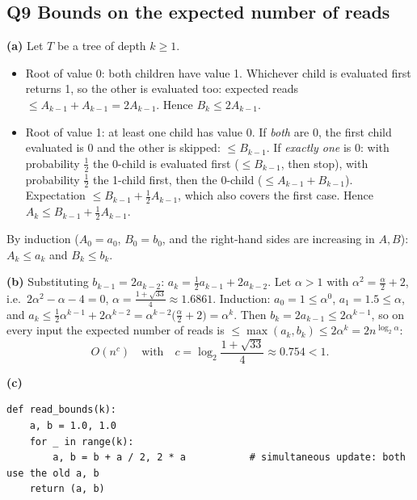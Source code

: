 \documentclass[11pt,a4paper]{article}
\newcommand{\pts}[3]{\fcolorbox{#3}{white}{\color{#3}\textbf{#1\,/\,#2}}}
\begin{document}
\subsection*{Q9 \quad Bounds on the expected number of reads \hfill \pts{0}{3}{none}}
\textbf{(a)} Let $T$ be a tree of depth $k\ge1$.
\begin{itemize}[nosep,leftmargin=1.2em]
\item Root of value 0: both children have value 1. Whichever child is evaluated first returns 1,
  so the other is evaluated too: expected reads $\le A_{k-1}+A_{k-1}=2A_{k-1}$. Hence
  $B_k\le 2A_{k-1}$.
\item Root of value 1: at least one child has value 0.
  If \emph{both} are 0, the first child evaluated is 0 and the other is skipped: $\le B_{k-1}$.
  If \emph{exactly one} is 0: with probability $\frac12$ the 0-child is evaluated first
  ($\le B_{k-1}$, then stop), with probability $\frac12$ the 1-child first, then the 0-child
  ($\le A_{k-1}+B_{k-1}$). Expectation $\le B_{k-1}+\frac12A_{k-1}$, which also covers the first
  case. Hence $A_k\le B_{k-1}+\frac12A_{k-1}$.
\end{itemize}
By induction ($A_0=a_0$, $B_0=b_0$, and the right-hand sides are increasing in $A,B$):
$A_k\le a_k$ and $B_k\le b_k$.

\textbf{(b)} Substituting $b_{k-1}=2a_{k-2}$: $a_k=\frac12a_{k-1}+2a_{k-2}$. Let $\alpha>1$ with
$\alpha^2=\frac\alpha2+2$, i.e.\ $2\alpha^2-\alpha-4=0$, $\alpha=\frac{1+\sqrt{33}}4\approx1.6861$.
Induction: $a_0=1\le\alpha^0$, $a_1=1.5\le\alpha$, and
$a_k\le\frac12\alpha^{k-1}+2\alpha^{k-2}=\alpha^{k-2}\big(\frac\alpha2+2\big)=\alpha^k$.
Then $b_k=2a_{k-1}\le2\alpha^{k-1}$, so on every input the expected number of reads is
$\le\max(a_k,b_k)\le2\alpha^{k}=2n^{\log_2\alpha}$:
\[
O(n^c)\quad\text{with}\quad c=\log_2\frac{1+\sqrt{33}}{4}\approx\mathbf{0.754}<1.
\]

\textbf{(c)}
\begin{lstlisting}
def read_bounds(k):
    a, b = 1.0, 1.0
    for _ in range(k):
        a, b = b + a / 2, 2 * a           # simultaneous update: both use the old a, b
    return (a, b)
\end{lstlisting}
\end{document}

